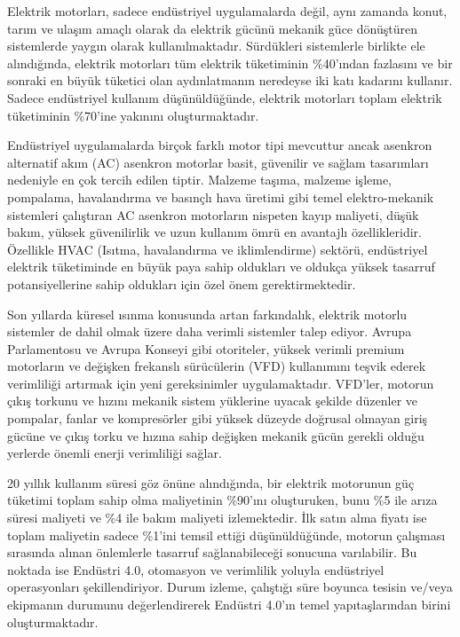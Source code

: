 Elektrik motorları, sadece endüstriyel uygulamalarda değil, aynı zamanda konut, tarım ve ulaşım amaçlı olarak da elektrik gücünü mekanik güce dönüştüren sistemlerde yaygın olarak kullanılmaktadır. Sürdükleri sistemlerle birlikte ele alındığında, elektrik motorları tüm elektrik tüketiminin \%40'ından fazlasını ve bir sonraki en büyük tüketici olan aydınlatmanın neredeyse iki katı kadarını kullanır. Sadece endüstriyel kullanım düşünüldüğünde, elektrik motorları toplam elektrik tüketiminin \%70'ine yakınını oluşturmaktadır.

Endüstriyel uygulamalarda birçok farklı motor tipi mevcuttur ancak asenkron alternatif akım (AC) asenkron motorlar basit, güvenilir ve sağlam tasarımları nedeniyle en çok tercih edilen tiptir. Malzeme taşıma, malzeme işleme, pompalama, havalandırma ve basınçlı hava üretimi gibi temel elektro-mekanik sistemleri çalıştıran AC asenkron motorların nispeten kayıp maliyeti, düşük bakım, yüksek güvenilirlik ve uzun kullanım ömrü en avantajlı özellikleridir. Özellikle HVAC (Isıtma, havalandırma ve iklimlendirme) sektörü, endüstriyel elektrik tüketiminde en büyük paya sahip oldukları ve oldukça yüksek tasarruf potansiyellerine sahip oldukları için özel önem gerektirmektedir.

Son yıllarda küresel ısınma konusunda artan farkındalık, elektrik motorlu sistemler de dahil olmak üzere daha verimli sistemler talep ediyor. Avrupa Parlamentosu ve Avrupa Konseyi gibi otoriteler, yüksek verimli premium motorların ve değişken frekanslı sürücülerin (VFD) kullanımını teşvik ederek verimliliği artırmak için yeni gereksinimler uygulamaktadır. VFD'ler, motorun çıkış torkunu ve hızını mekanik sistem yüklerine uyacak şekilde düzenler ve pompalar, fanlar ve kompresörler gibi yüksek düzeyde doğrusal olmayan giriş gücüne ve çıkış torku ve hızına sahip değişken mekanik gücün gerekli olduğu yerlerde önemli enerji verimliliği sağlar. 

20 yıllık kullanım süresi göz önüne alındığında, bir elektrik motorunun güç tüketimi toplam sahip olma maliyetinin \%90'ını oluşturuken, bunu \%5 ile arıza süresi maliyeti ve \%4 ile bakım maliyeti izlemektedir. İlk satın alma fiyatı ise toplam maliyetin sadece \%1'ini temsil ettiği düşünüldüğünde, motorun çalışması sırasında alınan önlemlerle tasarruf sağlanabileceği sonucuna varılabilir. Bu noktada ise Endüstri 4.0, otomasyon ve verimlilik yoluyla endüstriyel operasyonları şekillendiriyor. Durum izleme, çalıştığı süre boyunca tesisin ve/veya ekipmanın durumunu değerlendirerek Endüstri 4.0'ın temel yapıtaşlarından birini oluşturmaktadır. 

